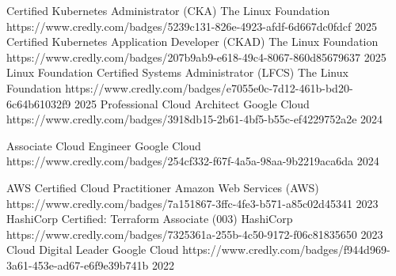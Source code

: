 

\begin{cvhonors}

  \cvhonor
    {Certified Kubernetes Administrator (CKA)} %
    {The Linux Foundation} %
    {https://www.credly.com/badges/5239c131-826e-4923-afdf-6d667dc0fdcf} %
    {2025} %
  \cvhonor
    {Certified Kubernetes Application Developer (CKAD)} %
    {The Linux Foundation} %
    {https://www.credly.com/badges/207b9ab9-e618-49c4-8067-860d85679637} %
    {2025} %
  \cvhonor
    {Linux Foundation Certified Systems Administrator (LFCS)} %
    {The Linux Foundation} %
    {https://www.credly.com/badges/e7055e0c-7d12-461b-bd20-6c64b61032f9} %
    {2025} %
  \cvhonor
    {Professional Cloud Architect} %
    {Google Cloud} %
    {https://www.credly.com/badges/3918db15-2b61-4bf5-b55c-ef4229752a2e} %
    {2024} %

  \cvhonor
    {Associate Cloud Engineer} %
    {Google Cloud} %
    {https://www.credly.com/badges/254cf332-f67f-4a5a-98aa-9b2219aca6da} %
    {2024} %

  \cvhonor
    {AWS Certified Cloud Practitioner} %
    {Amazon Web Services (AWS)} %
    {https://www.credly.com/badges/7a151867-3ffc-4fe3-b571-a85c02d45341} %
    {2023} %
  \cvhonor
    {HashiCorp Certified: Terraform Associate (003)} %
    {HashiCorp} %
    {https://www.credly.com/badges/7325361a-255b-4c50-9172-f06c81835650} %
    {2023} %
  \cvhonor
    {Cloud Digital Leader} %
    {Google Cloud} %
    {https://www.credly.com/badges/f944d969-3a61-453e-ad67-e6f9e39b741b} %
    {2022} %
\end{cvhonors}

